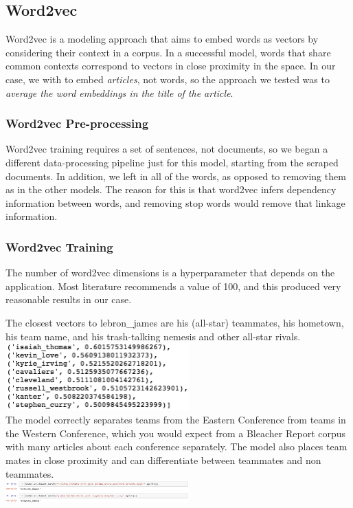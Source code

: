 \documentclass[11pt]{article}
\begin{document}
\subsection{Word2vec}
Word2vec is a modeling approach that aims to embed words as vectors by considering their context in a corpus.  In a successful model, words that share common contexts correspond to vectors in close proximity in the space.  In our case, we with to embed \textit{articles}, not words,  so the approach we tested was to \textit{average the word embeddings in the title of the article}.  \\

\subsubsection{Word2vec Pre-processing}
Word2vec training requires a set of sentences, not documents, so we began a different data-processing pipeline just for this model, starting from the scraped documents. In addition, we left in all of the words, as opposed to removing them as in the other models. The reason for this is that word2vec infers dependency information between words, and removing stop words would remove that linkage information. \\

\subsubsection{Word2vec Training}
The number of word2vec dimensions is a hyperparameter that depends on the application. Most literature recommends a value of 100, and this produced very reasonable results in our case.

The closest vectors to lebron\_james are his (all-star) teammates, his hometown, his team name, and his trash-talking nemesis and other all-star rivals. \\
\includegraphics[width=200pt]{james_word2vec.png} \\

The model correctly separates teams from the Eastern Conference from teams in the Western Conference, which you would expect from a Bleacher Report corpus with many articles about each conference separately. The model also places team mates in close proximity and can differentiate between teammates and non teammates. \\
\includegraphics[width=200pt]{word2vec_diffs.png} \\
\end{document}
